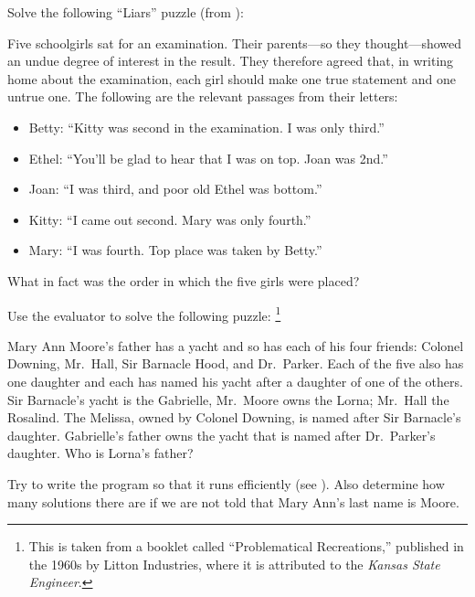 \begin{exercise}
	\label{Exercise 4.42}
	Solve the following “Liars” puzzle (from ):

	Five schoolgirls sat for an examination.
	Their parents---so they thought---showed an undue degree of interest in the result.
	They therefore agreed that, in writing home about the examination, each girl should make one true statement and one untrue one.
	The following are the relevant passages from their letters:
	\begin{itemize}

		\item
			Betty:
			“Kitty was second in the examination.
			I was only third.”

		\item
			Ethel:
			“You'll be glad to hear that I was on top.
			Joan was 2nd.”

		\item
			Joan:
			“I was third, and poor old Ethel was bottom.”

		\item
			Kitty:
			“I came out second.
			Mary was only fourth.”

		\item
			Mary:
			“I was fourth.
			Top place was taken by Betty.”

	\end{itemize}
	What in fact was the order in which the five girls were placed?
\end{exercise}



\begin{exercise}
	\label{Exercise 4.43}
	Use the  evaluator to solve the following puzzle:%
	\footnote{
		This is taken from a booklet called “Problematical Recreations,” published in the 1960s by Litton Industries, where it is attributed to the \textit{Kansas State Engineer}.
	}

	Mary Ann Moore’s father has a yacht and so has each of his four friends:
	Colonel Downing, Mr.~Hall, Sir Barnacle Hood, and Dr.~Parker.
	Each of the five also has one daughter and each has named his yacht after a daughter of one of the others.
	Sir Barnacle’s yacht is the Gabrielle, Mr.~Moore owns the Lorna;
	Mr.~Hall the Rosalind.
	The Melissa, owned by Colonel Downing, is named after Sir Barnacle’s daughter.
	Gabrielle’s father owns the yacht that is named after Dr.~Parker’s daughter.
	Who is Lorna’s father?

	Try to write the program so that it runs efficiently (see ).
	Also determine how many solutions there are if we are not told that Mary Ann’s last name is Moore.
\end{exercise}



